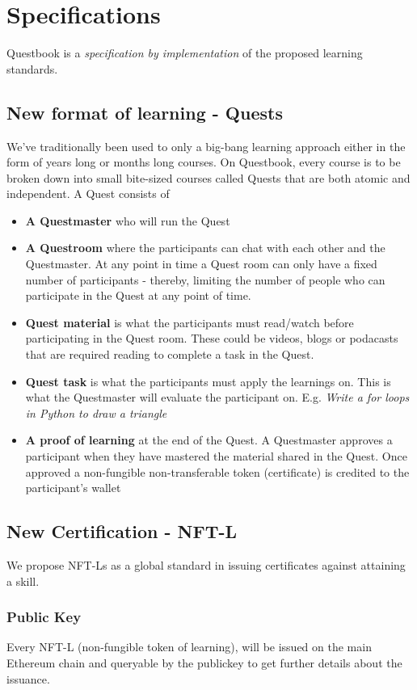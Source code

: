 \documentclass{article}
\begin{document}
  \section{Specifications}
    Questbook is a \textit{specification by implementation} of the proposed learning standards.
    \subsection{New format of learning - Quests}
      We've traditionally been used to only a big-bang learning approach either in the form of years long or months long courses.
      On Questbook, every course is to be broken down into small bite-sized courses called Quests that are both atomic and independent.
      A Quest consists of 
      \begin{itemize}
        \item \textbf{A Questmaster} who will run the Quest
        \item \textbf{A Questroom} where the participants can chat with each other and the Questmaster. At any point in time a Quest room can only have  a fixed number of participants - thereby, limiting the number of people who can participate in the Quest at any point of time.
        \item \textbf{Quest material} is what the participants must read/watch before participating in the Quest room. These could be videos, blogs or podacasts that are required reading to complete a task in the Quest.
        \item \textbf{Quest task} is what the participants must apply the learnings on. This is what the Questmaster will evaluate the participant on. E.g. \textit{Write a for loops in Python to draw a triangle}
        \item \textbf{A proof of learning} at the end of the Quest. A Questmaster approves a participant when they have mastered the material shared in the Quest. Once approved a non-fungible non-transferable token (certificate) is credited to the participant's wallet
      \end{itemize}
    \subsection{New Certification - NFT-L}
      We propose NFT-Ls as a global standard in issuing certificates against attaining a skill.
      \subsubsection{Public Key}
        Every NFT-L (non-fungible token of learning), will be issued on the main Ethereum chain and queryable by the publickey to get further details about the issuance.
\end{document}
